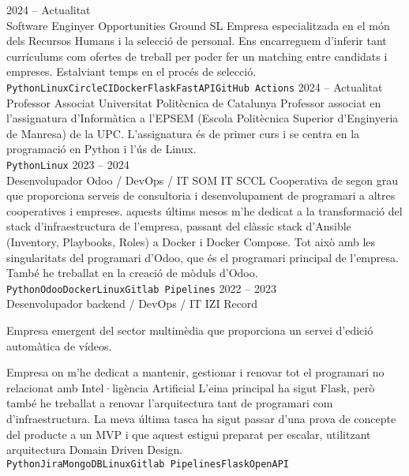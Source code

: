 \documentclass[9pt]{developercv} %
\begin{document}
\begin{entrylist}
	\entry
	{2024 -- Actualitat\\}
	{Software Enginyer}
	{Opportunities Ground SL}
	{Empresa especialitzada en el món dels Recursos Humans i la selecció de personal. Ens encarreguem d'inferir tant currículums com ofertes de treball per poder fer un matching entre candidats i empreses. Estalviant temps en el procés de selecció.
		\\ \texttt{Python}\slashsep\texttt{Linux}\slashsep\texttt{CircleCI}\slashsep\texttt{Docker}\slashsep\texttt{Flask}\slashsep\texttt{FastAPI}\slashsep\texttt{GitHub Actions}}
	\entry
	{2024 -- Actualitat\\}
	{Professor Associat}
	{Universitat Politècnica de Catalunya}
	{Professor associat en l'assignatura d'Informàtica a l'EPSEM (Escola Politècnica Superior d'Enginyeria de Manresa) de la UPC. L'assignatura és de primer curs i se centra en la programació en Python i l'ús de Linux.
		\\ \texttt{Python}\slashsep\texttt{Linux}}
	\entry
	{2023 -- 2024\\}
	{Desenvolupador Odoo / DevOps / IT}
	{SOM IT SCCL}
	{Cooperativa de segon grau que proporciona serveis de consultoria i desenvolupament de programari a altres cooperatives i empreses.
		aquests últims mesos m'he dedicat a la transformació del stack d'infraestructura de l'empresa, passant del clàssic stack d'Ansible (Inventory, Playbooks, Roles) a Docker i Docker Compose. Tot això amb les singularitats del programari d'Odoo, que és el programari principal de l'empresa. També he treballat en la creació de mòduls d'Odoo.
		\\ \texttt{Python}\slashsep\texttt{Odoo}\slashsep\texttt{Docker}\slashsep\texttt{Linux}\slashsep\texttt{Gitlab Pipelines}}
	\entry
	{2022 -- 2023\\}
	{Desenvolupador backend / DevOps / IT}
	{IZI Record}
	{Empresa emergent del sector multimèdia que proporciona un servei d'edició automàtica de vídeos.

		Empresa on m'he dedicat a mantenir, gestionar i renovar tot el programari no relacionat amb Intel·ligència Artificial  L'eina principal ha sigut Flask, però també he treballat a renovar
		l'arquitectura tant de programari com d'infraestructura. La meva última tasca ha sigut passar d'una prova de concepte del producte a un MVP i que aquest estigui preparat per escalar, utilitzant arquitectura Domain Driven Design.
		\\ \texttt{Python}\slashsep\texttt{Jira}\slashsep\texttt{MongoDB}\slashsep\texttt{Linux}\slashsep\texttt{Gitlab Pipelines}\slashsep\texttt{Flask}\slashsep\texttt{OpenAPI}}


\end{entrylist}
\end{document}

